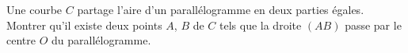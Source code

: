 Une courbe $C$ partage l'aire d'un parallélogramme en deux parties égales. Montrer qu'il existe deux points $A$, $B$ de $C$ tels que la droite $(AB)$ passe par le centre $O$ du parallélogramme.

